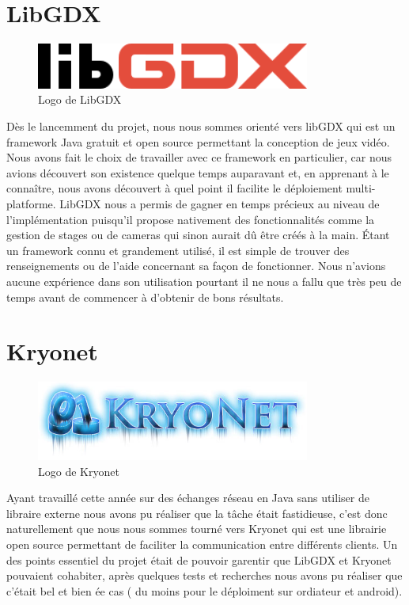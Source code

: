 \documentclass{report}
\begin{document}
\chapter{LibGDX}
\begin{figure}[H]
	\centering\includegraphics[width=9cm]{libgdx}
	\caption{Logo de LibGDX}
\end{figure}
Dès le lancemment du projet, nous nous sommes orienté vers libGDX qui est un
framework Java gratuit et open source permettant la conception de jeux vidéo.
Nous avons fait le choix de travailler avec ce framework en particulier, car
nous avions découvert son existence quelque temps auparavant et, en apprenant à le connaître,
nous avons découvert à quel point il facilite le déploiement multi-platforme.
LibGDX nous a permis de gagner en temps précieux au niveau de l’implémentation
puisqu’il propose nativement des fonctionnalités comme la gestion de stages ou
de cameras qui sinon aurait dû être créés à la main.
Étant un framework connu et grandement utilisé, il est simple de trouver des
renseignements ou de l’aide concernant sa façon de fonctionner. Nous n’avions
aucune expérience dans son utilisation pourtant il ne nous a fallu que très peu
 de temps avant de commencer à d’obtenir de bons résultats.

\chapter{Kryonet}
\begin{figure}[H]
	\centering\includegraphics[width=9cm]{kryonet}
	\caption{Logo de Kryonet}
\end{figure}
Ayant travaillé cette année sur des échanges réseau en Java sans utiliser de libraire externe nous avons pu réaliser que la tâche était fastidieuse, c'est donc naturellement que nous
nous sommes tourné vers Kryonet qui est une librairie open source permettant de faciliter la communication entre différents clients. Un des points essentiel du projet était de pouvoir
garentir que LibGDX et Kryonet pouvaient cohabiter, après quelques tests et recherches nous avons pu réaliser que c'était bel et bien ée cas ( du moins pour le déploiment sur ordiateur et android).
\end{document}
